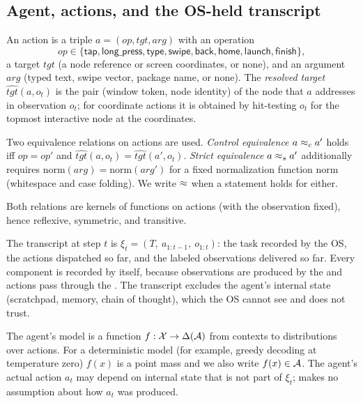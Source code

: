 \subsection{Agent, actions, and the OS-held transcript}

\begin{definition}[Action]\label{def:action}
An action is a triple $a=(\mathit{op},\mathit{tgt},\mathit{arg})$ with an operation
\[\mathit{op}\in\{\textsf{tap},\textsf{long\_press},\textsf{type},\textsf{swipe},\textsf{back},\textsf{home},\textsf{launch},\textsf{finish}\},\]
a target $\mathit{tgt}$ (a node reference or screen coordinates, or none), and an argument $\mathit{arg}$ (typed text, swipe vector, package name, or none). The \emph{resolved target} $\hat{\mathit{tgt}}(a,o_t)$ is the pair (window token, node identity) of the node that $a$ addresses in observation $o_t$; for coordinate actions it is obtained by hit-testing $o_t$ for the topmost interactive node at the coordinates.
\end{definition}

\begin{definition}\label{def:equiv}
Two equivalence relations on actions are used. \emph{Control equivalence} $a\approx_c a'$ holds iff $\mathit{op}=\mathit{op}'$ and $\hat{\mathit{tgt}}(a,o_t)=\hat{\mathit{tgt}}(a',o_t)$. \emph{Strict equivalence} $a\approx_s a'$ additionally requires $\mathrm{norm}(\mathit{arg})=\mathrm{norm}(\mathit{arg}')$ for a fixed normalization function $\mathrm{norm}$ (whitespace and case folding). We write $\approx$ when a statement holds for either.
\end{definition}

Both relations are kernels of functions on actions (with the observation fixed), hence reflexive, symmetric, and transitive.

\begin{definition}\label{def:transcript}
The transcript at step $t$ is $\xi_t=(T,\ a_{1:t-1},\ o_{1:t})$: the task recorded by the OS, the actions dispatched so far, and the labeled observations delivered so far. Every component is recorded by \PG{} itself, because observations are produced by the \LS{} and actions pass through the \DB{}. The transcript excludes the agent's internal state (scratchpad, memory, chain of thought), which the OS cannot see and does not trust.
\end{definition}

\begin{definition}\label{def:agent}
The agent's model is a function $f:\mathcal{X}\to\Delta(\mathcal{A})$ from contexts to distributions over actions. For a deterministic model (for example, greedy decoding at temperature zero) $f(x)$ is a point mass and we also write $f(x)\in\mathcal{A}$. The agent's actual action $a_t$ may depend on internal state that is not part of $\xi_t$; \PG{} makes no assumption about how $a_t$ was produced.
\end{definition}

